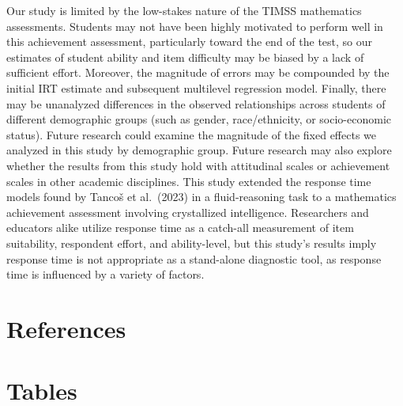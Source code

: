 \documentclass[
  number]{elsarticle}
\begin{document}
Our study is limited by the low-stakes nature of the TIMSS mathematics
assessments. Students may not have been highly motivated to perform well
in this achievement assessment, particularly toward the end of the test,
so our estimates of student ability and item difficulty may be biased by
a lack of sufficient effort. Moreover, the magnitude of errors may be
compounded by the initial IRT estimate and subsequent multilevel
regression model. Finally, there may be unanalyzed differences in the
observed relationships across students of different demographic groups
(such as gender, race/ethnicity, or socio-economic status). Future
research could examine the magnitude of the fixed effects we analyzed in
this study by demographic group. Future research may also explore
whether the results from this study hold with attitudinal scales or
achievement scales in other academic disciplines. This study extended
the response time models found by Tancoš et al.~(2023) in a
fluid-reasoning task to a mathematics achievement assessment involving
crystallized intelligence. Researchers and educators alike utilize
response time as a catch-all measurement of item suitability, respondent
effort, and ability-level, but this study's results imply response time
is not appropriate as a stand-alone diagnostic tool, as response time is
influenced by a variety of factors.

\section*{References}\label{references}

\renewcommand{\bibsection}{}


\section*{Tables}\label{tables}
\end{document}
